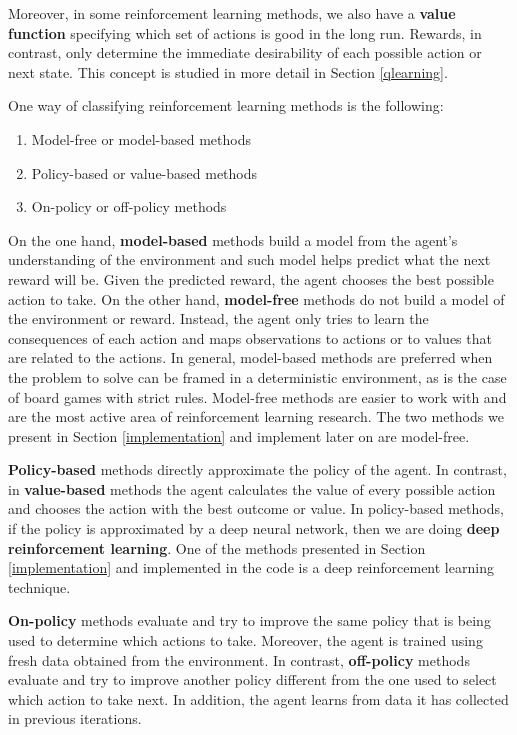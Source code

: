 \documentclass[11pt]{article}
\theoremstyle{definition}
\begin{document}
Moreover, in some reinforcement learning methods, we also have a \textbf{value function} specifying which set of actions is good in the long run. Rewards, in contrast, only determine the immediate desirability of each possible action or next state. This concept is studied in more detail in Section \ref{qlearning}.  

One way of classifying reinforcement learning methods is the following:

\begin{enumerate}[label=\roman*.]
    \item Model-free or model-based methods
    \item Policy-based or value-based methods
    \item On-policy or off-policy methods
\end{enumerate}

On the one hand, \textbf{model-based} methods build a model from the agent's understanding of the environment and such model helps predict what the next reward will be. Given the predicted reward, the agent chooses the best possible action to take. On the other hand, \textbf{model-free} methods do not build a model of the environment or reward. Instead, the agent only tries to learn the consequences of each action and maps observations to actions or to values that are related to the actions. In general, model-based methods are preferred when the problem to solve can be framed in a deterministic environment, as is the case of board games with strict rules. Model-free methods are easier to work with and are the most active area of reinforcement learning research. The two methods we present in Section \ref{implementation} and implement later on are model-free.

\textbf{Policy-based} methods directly approximate the policy of the agent. In contrast, in \textbf{value-based} methods the agent calculates the value of every possible action and chooses the action with the best outcome or value. In policy-based methods, if the policy is approximated by a deep neural network, then we are doing \textbf{deep reinforcement learning}. One of the methods presented in Section \ref{implementation} and implemented in the code is a deep reinforcement learning technique. 

\textbf{On-policy} methods evaluate and try to improve the same policy that is being used to determine which actions to take. Moreover, the agent is trained using fresh data obtained from the environment. In contrast, \textbf{off-policy} methods evaluate and try to improve another policy different from the one used to select which action to take next. In addition, the agent learns from data it has collected in previous iterations.  
\end{document}
